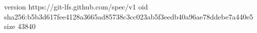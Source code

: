 version https://git-lfs.github.com/spec/v1
oid sha256:b5b3d617fee4128a3665ad85738c3cc023ab5f3eedb40a96ae78ddebe7a440e5
size 43840
